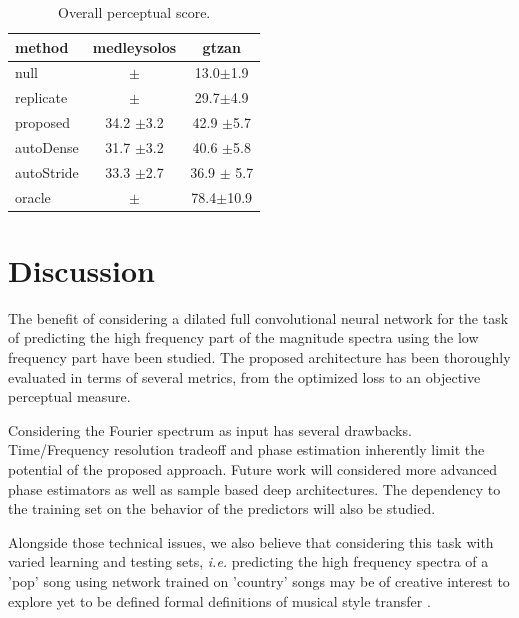 \documentclass{article}
\begin{document}
\begin{table}[t]
\begin{center}
\begin{tabular}{lcc}
method & medleysolos & gtzan \\
\hline
null & $\pm$ & 13.0$\pm$1.9  \\
replicate & $\pm$ & 29.7$\pm$4.9 \\
\hline
proposed & 34.2 $\pm$3.2 & 42.9 $\pm$5.7 \\
autoDense & 31.7 $\pm$3.2 & 40.6 $\pm$5.8 \\
autoStride & 33.3 $\pm$2.7 & 36.9 $\pm$ 5.7 \\
\hline
oracle  & $\pm$ & 78.4$\pm$10.9  \\
\end{tabular}
\caption{Overall perceptual score.}
\end{center}
\label{tab:ops}
\vspace{-4mm}
\end{table}

\section{Discussion}
\label{sec:discussion}

The benefit of considering a dilated full convolutional neural network for the task of predicting the high frequency part of the magnitude spectra using the low frequency part have been studied. The proposed architecture has been thoroughly evaluated in terms of several metrics, from the optimized loss to an objective perceptual measure.

Considering the Fourier spectrum as input has several drawbacks. Time/Frequency resolution tradeoff and phase estimation inherently limit the potential of the proposed approach. Future work will considered more advanced phase estimators as well as sample based deep architectures. The dependency to the training set on the behavior of the predictors will also be studied.




Alongside those technical issues, we also believe that considering this task with varied learning and testing sets, \textit{i.e.} predicting the high frequency spectra of a 'pop' song using network trained on 'country' songs may be of creative interest to explore yet to be defined formal definitions of musical style transfer \cite{dai2018music}.


\vfill\pagebreak




\end{document}
